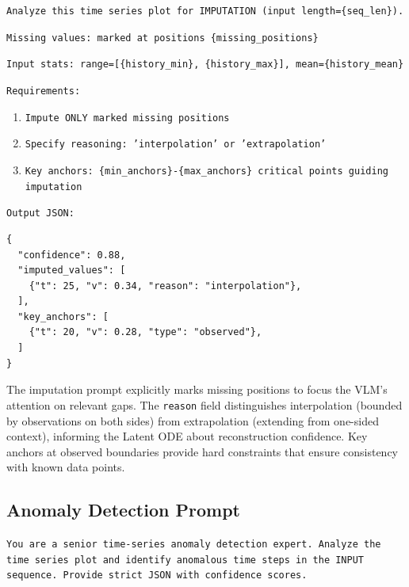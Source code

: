 \begin{tcolorbox}[colback=yellow!5, colframe=yellow!90, title=User Prompt Template (Imputation)]
\small
\texttt{Analyze this time series plot for IMPUTATION (input length=\{seq\_len\}).}

\texttt{Missing values: marked at positions \{missing\_positions\}}

\texttt{Input stats: range=[\{history\_min\}, \{history\_max\}], mean=\{history\_mean\}}

\texttt{Requirements:}
\begin{enumerate}[leftmargin=*, itemsep=0pt]
    \item \texttt{Impute ONLY marked missing positions}
    \item \texttt{Specify reasoning: 'interpolation' or 'extrapolation'}
    \item \texttt{Key anchors: \{min\_anchors\}-\{max\_anchors\} critical points guiding imputation}
\end{enumerate}

\texttt{Output JSON:}
\begin{verbatim}
{
  "confidence": 0.88,
  "imputed_values": [
    {"t": 25, "v": 0.34, "reason": "interpolation"},
  ],
  "key_anchors": [
    {"t": 20, "v": 0.28, "type": "observed"},
  ]
}
\end{verbatim}
\end{tcolorbox}

The imputation prompt explicitly marks missing positions to focus the VLM's attention on relevant gaps. The \texttt{reason} field distinguishes interpolation (bounded by observations on both sides) from extrapolation (extending from one-sided context), informing the Latent ODE about reconstruction confidence. Key anchors at observed boundaries provide hard constraints that ensure consistency with known data points.

\subsection{Anomaly Detection Prompt}
\label{appx:prompt_anomaly}

\begin{tcolorbox}[colback=gray!5, colframe=gray!50, title=System Prompt (Anomaly Detection)]
\small
\texttt{You are a senior time-series anomaly detection expert. Analyze the time series plot and identify anomalous time steps in the INPUT sequence. Provide strict JSON with confidence scores.}
\end{tcolorbox}

